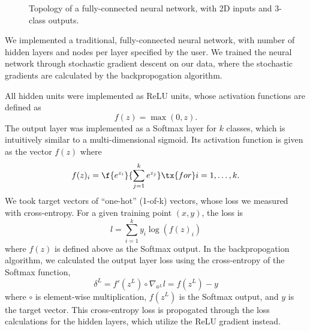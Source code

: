 \documentclass{article}
\begin{document}
\begin{multicols}{2}
\begin{figure}[t]
    \caption{Topology of a fully-connected neural network, with 2D inputs and 3-class outputs.}
\end{figure}

We implemented a traditional, fully-connected neural network, with
number of hidden layers and nodes per layer specified by the user.
We trained the neural network through stochastic gradient descent on
our data, where the stochastic gradients are calculated by the
backpropogation algorithm.

All hidden units were implemented as ReLU units, whose activation functions
are defined as
\begin{equation}
    f(z) = \max(0, z).
\end{equation}
The output layer was implemented as a Softmax layer for $k$ classes,
which is intuitively similar to a multi-dimensional sigmoid. Its activation function
is given as the vector $f(z)$ where
\begin{equation}
    f(z)_i = \f{e^{z_i}}{\sum_{j=1}^{k}{e^{z_j}}} \tx{ for } i = 1,\dots,k.
\end{equation}
We took target vectors of ``one-hot'' (1-of-k) vectors, whose loss we measured
with cross-entropy. For a given training point $(x,y)$, the loss is
\begin{equation}
l = \sum_{i = 1}^k{y_i \log(f(z)_i)}
\end{equation}
where $f(z)$ is defined above as the Softmax output.
In the backpropogation algorithm, we calculated the output layer loss using the
cross-entropy of the Softmax function,
\begin{equation}\delta^L = f'(z^L)\circ\nabla_{a^L}l = f(z^L) - y\end{equation}
where $\circ$ is element-wise multiplication, $f(z^L)$ is the Softmax output,
and $y$ is the target vector. This cross-entropy loss is propogated through the 
loss calculations for the hidden layers, which utilize the ReLU gradient instead.


\end{multicols}
\end{document}
